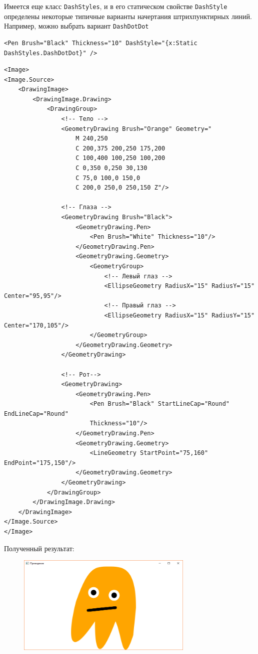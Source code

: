 Имеется еще класс \texttt{DashStyles}, и в его статическом свойстве \texttt{DashStyle} определены некоторые типичные варианты начертания штрихпунктирных линий. Например, можно выбрать вариант \texttt{DashDotDot}

\begin{verbatim}
<Pen Brush="Black" Thickness="10" DashStyle="{x:Static DashStyles.DashDotDot}" />
\end{verbatim}

\newpage
\begin{verbatim}
<Image>
<Image.Source>
    <DrawingImage>
        <DrawingImage.Drawing>
            <DrawingGroup>
                <!-- Тело -->
                <GeometryDrawing Brush="Orange" Geometry="
                    M 240,250
                    C 200,375 200,250 175,200
                    C 100,400 100,250 100,200
                    C 0,350 0,250 30,130
                    C 75,0 100,0 150,0
                    C 200,0 250,0 250,150 Z"/>
                
                <!-- Глаза -->
                <GeometryDrawing Brush="Black">
                    <GeometryDrawing.Pen>
                        <Pen Brush="White" Thickness="10"/>
                    </GeometryDrawing.Pen>
                    <GeometryDrawing.Geometry>
                        <GeometryGroup>
                            <!-- Левый глаз -->
                            <EllipseGeometry RadiusX="15" RadiusY="15" Center="95,95"/>
                            <!-- Правый глаз -->
                            <EllipseGeometry RadiusX="15" RadiusY="15" Center="170,105"/>
                        </GeometryGroup>
                    </GeometryDrawing.Geometry>
                </GeometryDrawing>
                
                <!-- Рот-->
                <GeometryDrawing>
                    <GeometryDrawing.Pen>
                        <Pen Brush="Black" StartLineCap="Round" EndLineCap="Round" 
                        Thickness="10"/>
                    </GeometryDrawing.Pen>
                    <GeometryDrawing.Geometry>
                        <LineGeometry StartPoint="75,160" EndPoint="175,150"/>
                    </GeometryDrawing.Geometry>
                </GeometryDrawing>
            </DrawingGroup>
        </DrawingImage.Drawing>
    </DrawingImage>
</Image.Source>
</Image>
\end{verbatim}

\newpage
Полученный результат:
\begin{figure}[H]
\centering
\includegraphics[width=0.75\textwidth]{ghost.png}
\end{figure}

